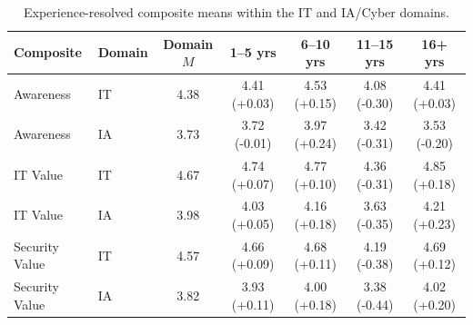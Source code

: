 \begin{table}[ht]
\centering
\caption{Experience-resolved composite means within the IT and IA/Cyber domains.}
\label{tab:exp_field_focus}
\small
\setlength{\tabcolsep}{5pt}
\begin{tabular}{@{}llccccc@{}}
\toprule
Composite & Domain & Domain $M$ & 1--5 yrs & 6--10 yrs & 11--15 yrs & 16+ yrs \\
\midrule
Awareness & IT & 4.38 & 4.41 (+0.03) & 4.53 (+0.15) & 4.08 (-0.30) & 4.41 (+0.03) \\
Awareness & IA & 3.73 & 3.72 (-0.01) & 3.97 (+0.24) & 3.42 (-0.31) & 3.53 (-0.20) \\
\addlinespace
IT Value & IT & 4.67 & 4.74 (+0.07) & 4.77 (+0.10) & 4.36 (-0.31) & 4.85 (+0.18) \\
IT Value & IA & 3.98 & 4.03 (+0.05) & 4.16 (+0.18) & 3.63 (-0.35) & 4.21 (+0.23) \\
\addlinespace
Security Value & IT & 4.57 & 4.66 (+0.09) & 4.68 (+0.11) & 4.19 (-0.38) & 4.69 (+0.12) \\
Security Value & IA & 3.82 & 3.93 (+0.11) & 4.00 (+0.18) & 3.38 (-0.44) & 4.02 (+0.20) \\
\bottomrule
\end{tabular}
\end{table}
